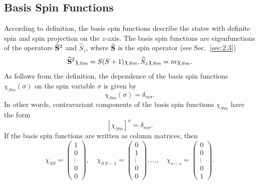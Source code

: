 \subsection{Basis Spin Functions}\label{sec:6.1.2}
According to definition, the basis spin functions describe the states with definite spin and spin projection on the $z$-axis. The basis spin functions are eigenfunctions of the operators $\widehat{\mathbf{S}}^{2}$ and $\widehat{S}_{z}$, where $\widehat{\mathbf{S}}$ is the spin operator (see Sec.~\ref{sec:2.3})
\begin{equation}
\widehat{\mathbf{S}}^{2} \chi_{S m}=S(S+1) \chi_{S m}, \widehat{S}_{z} \chi_{S m}=m \chi_{S m} . \label{eq:6:1:5}
\end{equation}
As follows from the definition, the dependence of the basis spin functions $\chi_{S m}(\sigma)$ on the spin variable $\sigma$ is given by
\begin{equation}
\chi_{S m}(\sigma)=\delta_{m \sigma} . \label{eq:6:1:6}
\end{equation}
In other words, contravariant components of the basis spin functions $\chi_{S m}$ have the form
\begin{equation}
\left[\chi_{S m}\right]^{\sigma}=\delta_{m \sigma}. \label{eq:6:1:7}
\end{equation}
If the basis spin functions are written as column matrices, then
\begin{equation}
\chi_{S S}=\begin{pmatrix}
1 \\
0 \\
\vdots \\
0 \\
0
\end{pmatrix}, \quad \chi_{S\, S-1}=\begin{pmatrix}
0 \\
1 \\
\vdots \\
0 \\
0
\end{pmatrix}, \ldots, \quad \chi_{s-s}=\begin{pmatrix}
0 \\
0 \\
\vdots \\
0 \\
1
\end{pmatrix} . \label{eq:6:1:8}
\end{equation}
